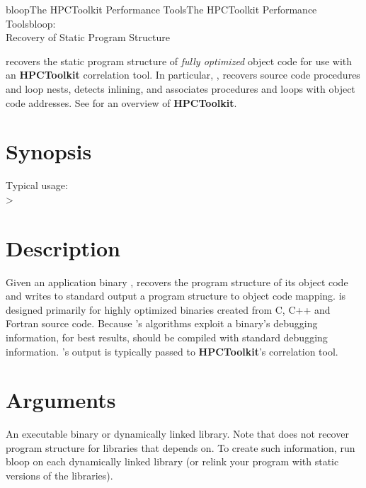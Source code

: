 \documentclass[english]{article}
\begin{document}
\begin{Name}{1}{bloop}{The HPCToolkit Performance Tools}{The HPCToolkit Performance Tools}{bloop:\\ Recovery of Static Program Structure}

 recovers the static program structure of \emph{fully optimized} object code for use with an \textbf{HPCToolkit} correlation tool.
In particular, , recovers source code procedures and loop nests, detects inlining, and associates procedures and loops with object code addresses.
See  for an overview of \textbf{HPCToolkit}.

\end{Name}

\section{Synopsis}

  

Typical usage:\\
  > 

\section{Description}

Given an application binary ,  recovers the program structure of its object code and writes to standard output a program structure to object code mapping.
 is designed primarily for highly optimized binaries created from C, C++ and Fortran source code.
Because 's algorithms exploit a binary's debugging information, for best results,  should be compiled with standard debugging information.
's output is typically passed to \textbf{HPCToolkit}'s correlation tool. %

\section{Arguments}

\begin{Description}
\item[\Arg{binary}] An executable binary or dynamically linked library.
Note that  does not recover program structure for libraries that  depends on.  To create such information, run bloop on each dynamically linked library (or relink your program with static versions of the libraries).
\end{Description}
\end{document}
